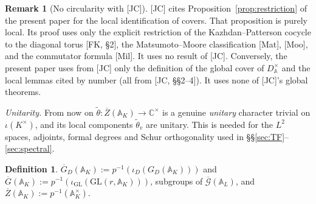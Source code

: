 \documentclass[12pt]{article}
\newcommand{\ov}[1]{\overline{#1}}
\newcommand{\A}{\mathbb{A}}
\newcommand{\C}{\mathbb{C}}
\newcommand{\GL}{\mathrm{GL}}
\newcommand{\Gb}{\ov{G}}
\newcommand{\Zb}{\ov{Z}}
\newcommand{\GDb}{\ov{G}_D}
\newcommand{\cGb}{\ov{\mathcal{G}}}
\newcommand{\iD}{\iota_D}
\newcommand{\iG}{\iota_{\GL}}
\theoremstyle{plain}
\theoremstyle{definition}
\newtheorem{definition}[theorem]{Definition}
\newtheorem{remark}[theorem]{Remark}
\begin{document}
\begin{remark}[No circularity with {[JC]}]\label{rem:nocirc}
[JC] cites Proposition~\ref{prop:restriction} of the present paper for the local identification of covers. That proposition is purely local. Its proof uses only the explicit restriction of the Kazhdan--Patterson cocycle to the diagonal torus [FK, \S2], the Matsumoto--Moore classification [Mat], [Moo], and the commutator formula [Mil]. It uses no result of [JC]. Conversely, the present paper uses from [JC] only the definition of the global cover of $D^\times_{\A}$ and the local lemmas cited by number (all from [JC, \S\S2--4]). It uses none of [JC]'s global theorems.
\end{remark}

\emph{Unitarity.} From now on $\tilde\theta:\Zb(\A_K)\to\C^\times$ is a genuine \emph{unitary} character trivial on $\iota(K^\times)$, and its local components $\tilde\theta_v$ are unitary. This is needed for the $L^2$ spaces, adjoints, formal degrees and Schur orthogonality used in \S\S\ref{sec:TF}--\ref{sec:spectral}.

\begin{definition}
$\GDb(\A_K):=p^{-1}(\iD(G_D(\A_K)))$ and $\Gb(\A_K):=p^{-1}(\iG(\GL(r,\A_K)))$, subgroups of $\cGb(\A_L)$, and $\Zb(\A_K):=p^{-1}(\A_K^\times)$.
\end{definition}
\end{document}
